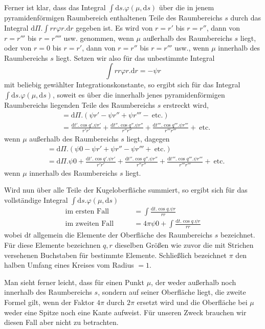 Ferner ist klar, dass das Integral $\int\mathrm{d}s.\varphi(\mu,\mathrm{d}s)$ über die in jenem pyramidenförmigen Raumbereich enthaltenen Teile des Raumbereichs $s$ durch das Integral $\mathrm{d}\Pi.\int rr\varphi r.\mathrm{d}r$ gegeben ist. Es wird von $r=r'$ bis $r=r''$, dann von $r=r'''$ bis $r=r''''$ usw. genommen, wenn $\mu$ außerhalb des Raumbereichs $s$ liegt, oder von $r=0$ bis $r=r'$, dann von $r=r''$ bis $r=r'''$ usw., wenn $\mu$ innerhalb des Raumbereichs $s$ liegt. Setzen wir also für das unbestimmte Integral
\[
\int rr\varphi r.\mathrm{d}r=-\psi r
\]
mit beliebig gewählter Integrationskonstante, so ergibt sich für das Integral $\int\mathrm{d}s.\varphi(\mu,\mathrm{d}s)$, soweit es über die innerhalb jenes pyramidenförmigen Raumbereichs liegenden Teile des Raumbereichs $s$ erstreckt wird,
\[
\begin{aligned}
&=\mathrm{d}\Pi.(\psi r'-\psi r''+\psi r'''-\ \text{etc.})\\
&=\frac{\mathrm{d}t'.\cos q'.\psi r'}{r'r'}+\frac{\mathrm{d}t''.\cos q''.\psi r''}{r''r''}+\frac{\mathrm{d}t'''.\cos q'''.\psi r'''}{r'''r'''}+\ \text{etc.}
\end{aligned}
\]
wenn $\mu$ außerhalb des Raumbereichs $s$ liegt, dagegen
\[
\begin{aligned}
&=\mathrm{d}\Pi.(\psi0-\psi r'+\psi r''-\psi r'''+\ \text{etc.})\\
&=\mathrm{d}\Pi.\psi0+\frac{\mathrm{d}t'.\cos q'.\psi r'}{r'r'}+\frac{\mathrm{d}t''.\cos q''.\psi r''}{r''r''}+\frac{\mathrm{d}t'''.\cos q'''.\psi r'''}{r'''r'''}+\ \text{etc.}
\end{aligned}
\]
wenn $\mu$ innerhalb des Raumbereichs $s$ liegt.

Wird nun über alle Teile der Kugeloberfläche summiert, so ergibt sich für das vollständige Integral $\int\mathrm{d}s.\varphi(\mu,\mathrm{d}s)$
\[
\begin{aligned}
\text{im ersten Fall}\qquad&=\int\frac{\mathrm{d}t.\cos q.\psi r}{rr}\\
\text{im zweiten Fall}\qquad&=4\pi\psi0+\int\frac{\mathrm{d}t.\cos q.\psi r}{rr}
\end{aligned}
\]
wobei $\mathrm{d}t$ allgemein die Elemente der Oberfläche des Raumbereichs $s$ bezeichnet. Für diese Elemente bezeichnen $q,r$ dieselben Größen wie zuvor die mit Strichen versehenen Buchstaben für bestimmte Elemente. Schließlich bezeichnet $\pi$ den halben Umfang eines Kreises vom Radius $=1$.

Man sieht ferner leicht, dass für einen Punkt $\mu$, der weder außerhalb noch innerhalb des Raumbereichs $s$, sondern auf seiner Oberfläche liegt, die zweite Formel gilt, wenn der Faktor $4\pi$ durch $2\pi$ ersetzt wird und die Oberfläche bei $\mu$ weder eine Spitze noch eine Kante aufweist. Für unseren Zweck brauchen wir diesen Fall aber nicht zu betrachten.

